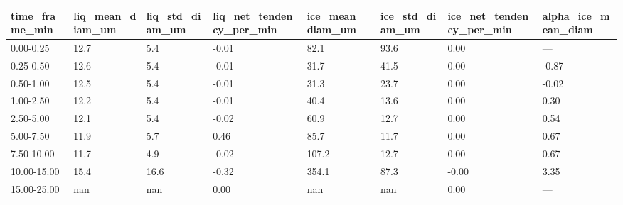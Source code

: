 \begin{tabular}{llllllll}
\toprule
time_frame_min & liq_mean_diam_um & liq_std_diam_um & liq_net_tendency_per_min & ice_mean_diam_um & ice_std_diam_um & ice_net_tendency_per_min & alpha_ice_mean_diam \\
\midrule
0.00-0.25 & 12.7 & 5.4 & -0.01 & 82.1 & 93.6 & 0.00 & — \\
0.25-0.50 & 12.6 & 5.4 & -0.01 & 31.7 & 41.5 & 0.00 & -0.87 \\
0.50-1.00 & 12.5 & 5.4 & -0.01 & 31.3 & 23.7 & 0.00 & -0.02 \\
1.00-2.50 & 12.2 & 5.4 & -0.01 & 40.4 & 13.6 & 0.00 & 0.30 \\
2.50-5.00 & 12.1 & 5.4 & -0.02 & 60.9 & 12.7 & 0.00 & 0.54 \\
5.00-7.50 & 11.9 & 5.7 & 0.46 & 85.7 & 11.7 & 0.00 & 0.67 \\
7.50-10.00 & 11.7 & 4.9 & -0.02 & 107.2 & 12.7 & 0.00 & 0.67 \\
10.00-15.00 & 15.4 & 16.6 & -0.32 & 354.1 & 87.3 & -0.00 & 3.35 \\
15.00-25.00 & nan & nan & 0.00 & nan & nan & 0.00 & — \\
\bottomrule
\end{tabular}
